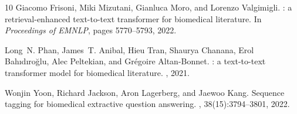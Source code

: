 \documentclass[11pt]{article}
\begin{document}
\begin{thebibliography}{10}
Giacomo Frisoni, Miki Mizutani, Gianluca Moro, and Lorenzo Valgimigli.
: a retrieval-enhanced text-to-text transformer for biomedical literature.
\newblock In {\em Proceedings of EMNLP}, pages 5770--5793, 2022.

Long~N. Phan, James~T. Anibal, Hieu Tran, Shaurya Chanana, Erol Bah{\i}d{\i}ro{\u g}lu, Alec Peltekian, and Gr{\'e}goire Altan-Bonnet.
: a text-to-text transformer model for biomedical literature.
, 2021.

Wonjin Yoon, Richard Jackson, Aron Lagerberg, and Jaewoo Kang.
\newblock Sequence tagging for biomedical extractive question answering.
, 38(15):3794--3801, 2022.

\end{thebibliography}
\end{document}
